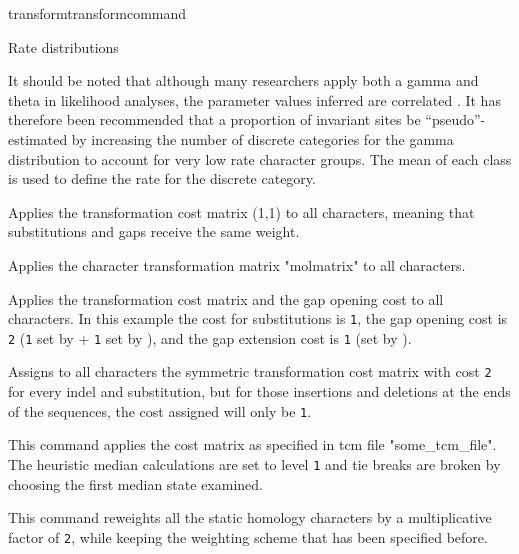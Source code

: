 \begin{command}{transform}{transformcommand}
\begin{arguments}
\begin{argumentgroup}{Rate distributions}
\begin{statement}
It should be noted that although many researchers apply both
a gamma and theta in likelihood analyses, the parameter
values inferred are correlated \cite{sullivan1999}. It has
therefore been recommended that a proportion of invariant
sites be ``pseudo''-estimated by increasing the number of
discrete categories for the gamma distribution to account
for very low rate character groups. The mean of each class
is used to define the rate for the discrete category.
\end{statement}

\end{argumentgroup}

\end{arguments}



\begin{poyexamples} 
{Applies the transformation cost matrix (1,1) to all characters,
meaning that substitutions and gaps receive the same weight.}

{Applies the character transformation matrix "molmatrix" to all
characters.}

{Applies the transformation cost matrix and the gap opening cost
to all characters. In this example the cost for substitutions is \texttt{1},
the gap opening cost is \texttt{2} (\texttt{1} set by 
+ \texttt{1} set by ), and the gap extension cost is \texttt{1}
(set by ).}

{Assigns to all characters the symmetric transformation cost
matrix with cost \texttt{2} for every indel and substitution, but for those
insertions and deletions at the ends of the sequences, the cost
assigned will only be \texttt{1}.}

{This command applies the cost matrix as specified in tcm file 
"some\_tcm\_file". The heuristic median calculations are set to 
level \texttt{1} and tie breaks are broken
by choosing the first median state examined.}

{This command reweights all the static homology characters
by a multiplicative factor of \texttt{2}, while keeping the weighting
scheme that has been specified before.}


\end{poyexamples}
\end{command}
